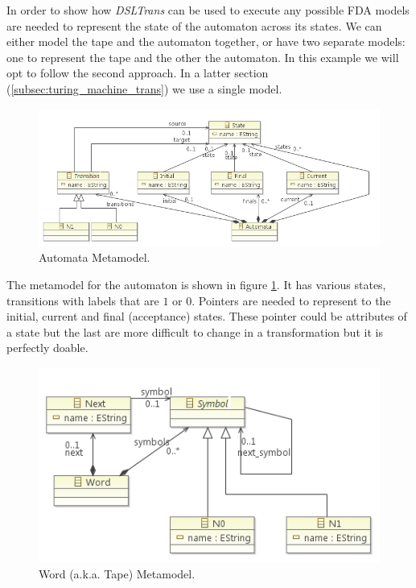 In order to show how \emph{DSLTrans} can be used to execute any possible FDA models are needed to represent the state of the automaton across its states. We can either model the tape and the automaton together, or have two separate models: one to represent the tape and the other the automaton. In this example we will opt to follow the second approach. In a latter section (\ref{subsec:turing_machine_trans}) we use a single model.

\begin{figure}[h]
\begin{center}
  \includegraphics[scale=0.7]{imgs/automata_metamodel.png}
  \caption{Automata Metamodel.}
  \label{fig:automata_metamodel}
\end{center}
\end{figure}

The metamodel for the automaton is shown in figure \ref{fig:automata_metamodel}. It has various states, transitions with labels that are $1$ or $0$. Pointers are needed to represent to the initial, current and final (acceptance) states. These pointer could be attributes of a state but the last are more difficult to change in a transformation but it is perfectly doable.

\begin{figure}[h]
\begin{center}
  \includegraphics[scale=0.7]{imgs/word_metamodel.png}
  \caption{Word (a.k.a. Tape) Metamodel.}
  \label{fig:word_metamodel}
\end{center}
\end{figure}

